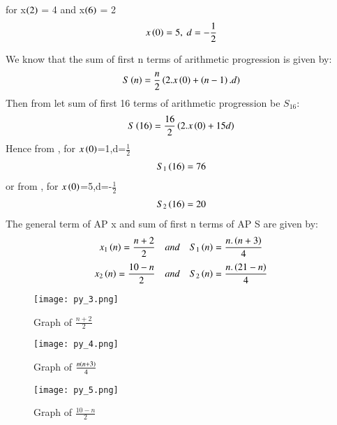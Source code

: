 \documentclass[beamer]{IEEEtran}
\theoremstyle{remark}
\begin{document}
for x$\left(2\right)$ = 4 and x$\left(6\right)$ = 2
\begin{align}
x\left(0\right)=5,\ d=-\frac{1}{2}
\end{align}

We know that the sum of first n terms of arithmetic progression is given by:
\begin{equation}
\label{q9}
S\left(n\right)= \frac{n}{2}\left(2.x\left(0\right)+\left(n-1\right).d\right)
\end{equation}
Then from \brak{\ref{q9}} let sum of first 16 terms of arithmetic progression be $S_{16}$:
\begin{equation}
\label{q10}
S\left(16\right)= \frac{16}{2}\left(2.x\left(0\right)+15d\right)
\end{equation}
Hence from \brak{\ref{q10}},
for $x\left(0\right)$=1,d=$\frac{1}{2}$
\begin{align}
\label{11}
S_1\left(16\right)=76
\end{align}
or from \brak{\ref{q10}},
for $x\left(0\right)$=5,d=-$\frac{1}{2}$
\begin{align}
\label{12}
S_2\left(16\right)=20
\end{align}
The general term of AP x and sum of first n terms of AP S are given by:
\begin{align}
x_1\left(n\right)=\frac{n+2}{2}\quad and\quad S_1\left(n\right)=\frac{n.\left(n+3\right)}{4}
\end{align}
\begin{align}
x_2\left(n\right)=\frac{10-n}{2}\quad and\quad S_2\left(n\right)=\frac{n.\left(21-n\right)}{4}
\end{align}

\begin{figure}[h]
    \centering
    \texttt{[image: py\_3.png]}
    \label{fig:enter-label}
    \caption*{Graph of $\frac{n+2}{2}$}
\end{figure}

\begin{figure}[h]
    \centering
    \texttt{[image: py\_4.png]}
    \label{fig:enter-label}
    \caption*{Graph of $\frac{n\left(n+3\right)}{4}$}
\end{figure}

\begin{figure}[h]
    \centering
    \texttt{[image: py\_5.png]}
    \label{fig:enter-label}
    \caption*{Graph of $\frac{10-n}{2}$}
\end{figure}
\end{document}

